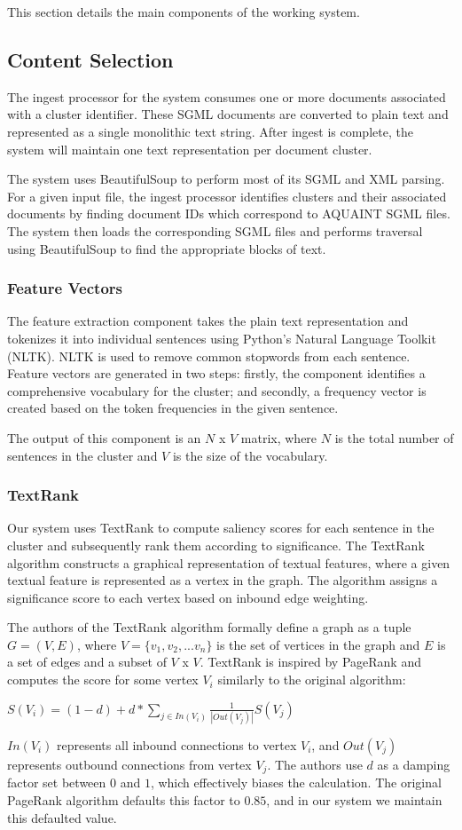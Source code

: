 \documentclass[11pt]{article}
\begin{document}
This section details the main components of the working system.

\subsection{Content Selection}
The ingest processor for the system consumes one or more documents associated with a cluster identifier. These SGML documents are converted to plain text and represented as a single monolithic text string. After ingest is complete, the system will maintain one text representation per document cluster.

The system uses BeautifulSoup to perform most of its SGML and XML parsing. For a given input file, the ingest processor identifies clusters and their associated documents by finding document IDs which correspond to AQUAINT SGML files. The system then loads the corresponding SGML files and performs traversal using BeautifulSoup to find the appropriate blocks of text.
\subsubsection{Feature Vectors}
The feature extraction component takes the plain text representation and tokenizes it into individual sentences using Python's Natural Language Toolkit (NLTK). NLTK is used to remove common stopwords from each sentence. Feature vectors are generated in two steps: firstly, the component identifies a comprehensive vocabulary for the cluster; and secondly, a frequency vector is created based on the token frequencies in the given sentence. 

The output of this component is an $N$ x $V$ matrix, where $N$ is the total number of sentences in the cluster and $V$ is the size of the vocabulary. 
\subsubsection{TextRank}
Our system uses TextRank to compute saliency scores for each sentence in the cluster and subsequently rank them according to significance. The TextRank algorithm constructs a graphical representation of textual features, where a given textual feature is represented as a vertex in the graph. The algorithm assigns a significance score to each vertex based on inbound edge weighting.

The authors of the TextRank algorithm formally define a graph as a tuple $G = (V,E)$, where $V = \{v_1, v_2, ... v_n\}$ is the set of vertices in the graph and $E$ is a set of edges and a subset of $V$ x $V$. TextRank is inspired by PageRank and computes the score for some vertex $V_i$ similarly to the original algorithm:
\begin{center}
    $S(V_i) = (1 - d) + d * \sum_{j \in In(V_i)} \frac{1}{|Out(V_j)|}S(V_j)$
\end{center}
$In(V_i)$ represents all inbound connections to vertex $V_i$, and $Out(V_j)$ represents outbound connections from vertex $V_j$. The authors use $d$ as a damping factor set between $0$ and $1$, which effectively biases the calculation. The original PageRank algorithm defaults this factor to $0.85$, and in our system we maintain this defaulted value.
\end{document}
